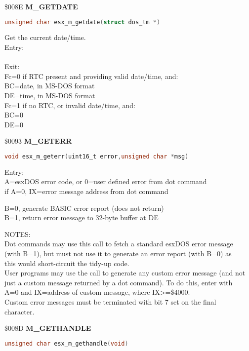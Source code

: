 \$008E \textbf{M\_GETDATE}

\begin{lstlisting}[language=C]
unsigned char esx_m_getdate(struct dos_tm *)
\end{lstlisting}

Get the current date/time.\\
Entry:\\
-\\
Exit:\\
Fc=0 if RTC present and providing valid date/time, and:\\
BC=date, in MS-DOS format\\
DE=time, in MS-DOS format\\
Fc=1 if no RTC, or invalid date/time, and:\\
BC=0\\
DE=0

\$0093 \textbf{M\_GETERR}

\begin{lstlisting}[language=C]
void esx_m_geterr(uint16_t error,unsigned char *msg)
\end{lstlisting}

Entry:\\
A=esxDOS error code, or 0=user defined error from dot command\\
if A=0, IX=error message address from dot command

B=0, generate BASIC error report (does not return)\\
B=1, return error message to 32-byte buffer at DE

NOTES:\\
Dot commands may use this call to fetch a standard esxDOS error message\\
(with B=1), but must not use it to generate an error report (with B=0) as\\
this would short-circuit the tidy-up code.\\
User programs may use the call to generate any custom error message (and not\\
just a custom message returned by a dot command). To do this, enter with\\
A=0 and IX=address of custom message, where IX>=\$4000.\\
Custom error messages must be terminated with bit 7 set on the final\\
character.

\$008D \textbf{M\_GETHANDLE}

\begin{lstlisting}[language=C]
unsigned char esx_m_gethandle(void)
\end{lstlisting}

